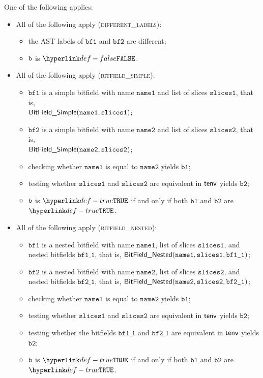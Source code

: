 \documentclass{book}
\newcommand\ProseOrTypeError[0]{\ProseTerminateAs{\TypeErrorConfig}}
\newcommand\bfone[0]{\texttt{bf1}}
\newcommand\bftwo[0]{\texttt{bf2}}
\newcommand\bfoneone[0]{\texttt{bf1\_1}}
\newcommand\bftwoone[0]{\texttt{bf2\_1}}
\newcommand\vbone[0]{\texttt{b1}}
\newcommand\vbtwo[0]{\texttt{b2}}
\newcommand\nameone[0]{\texttt{name1}}
\newcommand\nametwo[0]{\texttt{name2}}
\newcommand\slicesone[0]{\texttt{slices1}}
\newcommand\slicestwo[0]{\texttt{slices2}}
\begin{document}
One of the following applies:
\begin{itemize}
  \item All of the following apply (\textsc{different\_labels}):
  \begin{itemize}
    \item the AST labels of $\bfone$ and $\bftwo$ are different;
    \item $\texttt{b}$ is $\False$.
  \end{itemize}

  \item All of the following apply (\textsc{bitfield\_simple}):
  \begin{itemize}
    \item $\bfone$ is a simple bitfield with name $\nameone$ and list of slices $\slicesone$, that is, \\ $\BitFieldSimple(\nameone, \slicesone)$;
    \item $\bftwo$ is a simple bitfield with name $\nametwo$ and list of slices $\slicestwo$, that is, \\ $\BitFieldSimple(\nametwo, \slicestwo)$;
    \item checking whether $\nameone$ is equal to $\nametwo$ yields $\vbone$;
    \item testing whether $\slicesone$ and $\slicestwo$ are equivalent in $\textsf{tenv}$ yields $\vbtwo$\ProseOrTypeError;
    \item $\texttt{b}$ is $\True$ if and only if both $\vbone$ and $\vbtwo$ are $\True$.
  \end{itemize}

  \item All of the following apply (\textsc{bitfield\_nested}):
  \begin{itemize}
    \item $\bfone$ is a nested bitfield with name $\nameone$, list of slices $\slicesone$, and nested bitfields $\bfoneone$, that is,
          $\BitFieldNested(\nameone, \slicesone, \bfoneone)$;
    \item $\bftwo$ is a nested bitfield with name $\nametwo$, list of slices $\slicestwo$, and nested bitfields $\bftwoone$, that is,
          $\BitFieldNested(\nametwo, \slicestwo, \bftwoone)$;
    \item checking whether $\nameone$ is equal to $\nametwo$ yields $\vbone$;
    \item testing whether $\slicesone$ and $\slicestwo$ are equivalent in $\textsf{tenv}$ yields $\vbtwo$\ProseOrTypeError;
    \item testing whether the bitfields $\bfoneone$ and $\bftwoone$ are equivalent in $\textsf{tenv}$ yields $\vbtwo$\ProseOrTypeError;
    \item $\texttt{b}$ is $\True$ if and only if both $\vbone$ and $\vbtwo$ are $\True$.
  \end{itemize}


\end{itemize}
\end{document}
